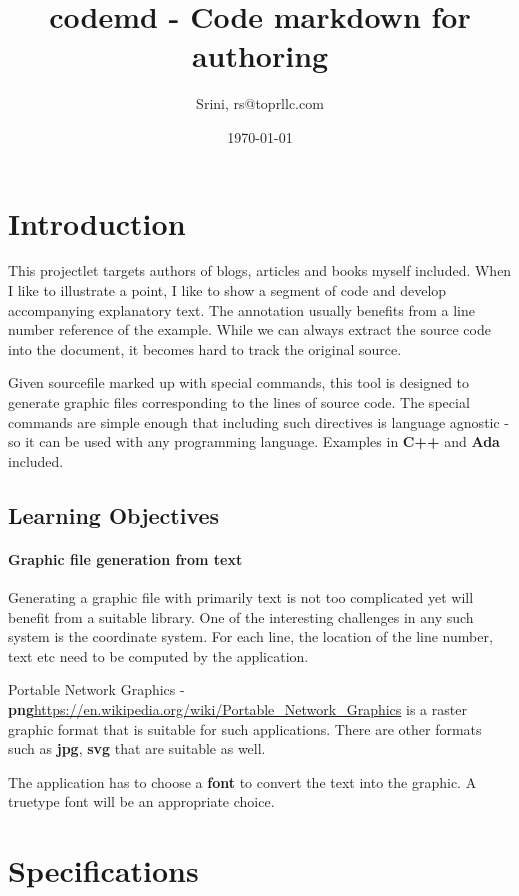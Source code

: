 \documentclass[12pt, a4paper]{article}
\title{codemd - Code markdown for authoring} %
\author{Srini, rs@toprllc.com}
\date{\small \today}
\begin{document}
\maketitle 
\setcounter{page}{1} 

\section{Introduction} 

This projectlet targets authors of blogs, articles and books myself included. When I like to illustrate a point, I like to show a segment of code and develop accompanying explanatory text. The annotation usually benefits from a line number reference of the example. While we can always extract the source code into the document, it becomes hard to track the original source. 

Given sourcefile marked up with special commands, this tool is designed to generate graphic files corresponding to the lines of source code. The special commands are simple enough that including such directives is language agnostic - so it can be used with any programming language. Examples in \textbf{C++} and \textbf{Ada} included.

\subsection{Learning Objectives}

\paragraph{Graphic file generation from text}
Generating a graphic file with primarily text is not too complicated yet will benefit from a suitable library. One of the interesting challenges in any such system is the coordinate system. For each line, the location of the line number, text etc need to be computed by the application.

Portable Network Graphics - \textbf{png}\url{https://en.wikipedia.org/wiki/Portable_Network_Graphics} is a raster graphic format that is suitable for such applications. There are other formats such as \textbf{jpg}, \textbf{svg} that are suitable as well.

The application has to choose a \textbf{font} to convert the text into the graphic. A truetype font will be an appropriate choice.

\section{Specifications}
\end{document}
